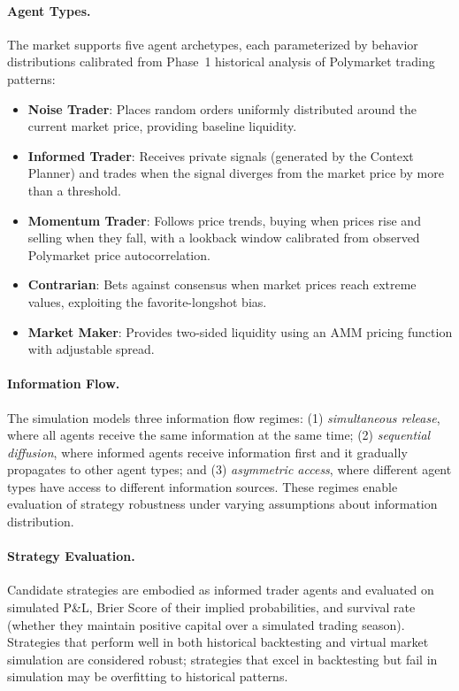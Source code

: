 \paragraph{Agent Types.} The market supports five agent archetypes, each parameterized by behavior distributions calibrated from Phase~1 historical analysis of Polymarket trading patterns:

\begin{itemize}
    \item \textbf{Noise Trader}: Places random orders uniformly distributed around the current market price, providing baseline liquidity.
    \item \textbf{Informed Trader}: Receives private signals (generated by the Context Planner) and trades when the signal diverges from the market price by more than a threshold.
    \item \textbf{Momentum Trader}: Follows price trends, buying when prices rise and selling when they fall, with a lookback window calibrated from observed Polymarket price autocorrelation.
    \item \textbf{Contrarian}: Bets against consensus when market prices reach extreme values, exploiting the favorite-longshot bias.
    \item \textbf{Market Maker}: Provides two-sided liquidity using an AMM pricing function with adjustable spread.
\end{itemize}

\paragraph{Information Flow.} The simulation models three information flow regimes: (1) \emph{simultaneous release}, where all agents receive the same information at the same time; (2) \emph{sequential diffusion}, where informed agents receive information first and it gradually propagates to other agent types; and (3) \emph{asymmetric access}, where different agent types have access to different information sources. These regimes enable evaluation of strategy robustness under varying assumptions about information distribution.

\paragraph{Strategy Evaluation.} Candidate strategies are embodied as informed trader agents and evaluated on simulated P\&L, Brier Score of their implied probabilities, and survival rate (whether they maintain positive capital over a simulated trading season). Strategies that perform well in both historical backtesting and virtual market simulation are considered robust; strategies that excel in backtesting but fail in simulation may be overfitting to historical patterns.
